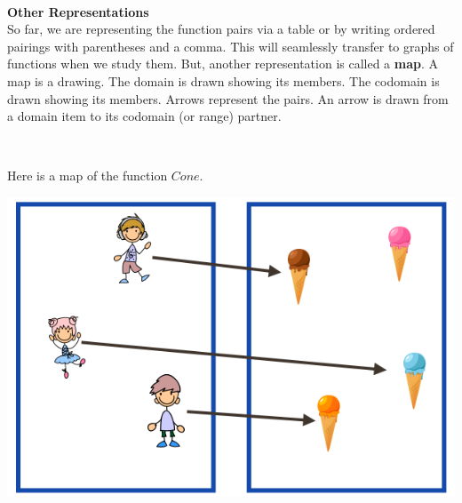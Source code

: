 \documentclass{ximera}
\begin{document}
\quad \\

\textbf{Other Representations} \\
So far, we are representing the function pairs via a table or by writing ordered pairings with parentheses and a comma.  This will seamlessly transfer to graphs of functions when we study them.  But, another representation is called a \textbf{map}.  A map is a drawing.  The domain is drawn showing its members. The codomain is drawn showing its members. Arrows represent the pairs.  An arrow is drawn from a domain item to its codomain (or range) partner.

\quad \\


\begin{example}
Here is a map of the function $Cone$.

\begin{image}
\includegraphics{pics/f_20.png}
\end{image}

\end{example}
\end{document}
